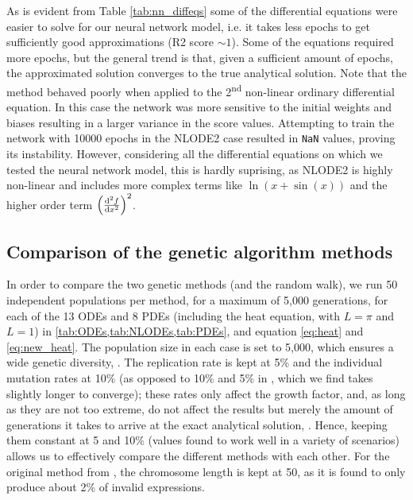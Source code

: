 \documentclass[aps,reprint,superscriptaddress,nofootinbib]{revtex4-2}
\begin{document}
    As is evident from Table \ref{tab:nn_diffeqs} some of the differential equations were easier to solve for our neural network model, i.e. it takes less epochs to get sufficiently good approximations (R2 score $\sim 1$). Some of the equations required more epochs, but the general trend is that, given a sufficient amount of epochs, the approximated solution converges to the true analytical solution.
    Note that the method behaved poorly when applied to the 2\textsuperscript{nd} non-linear ordinary differential equation. In this case the network was more sensitive to the initial weights and biases resulting in a larger variance in the score values. Attempting to train the network with 10000 epochs in the NLODE2 case resulted in \texttt{NaN} values, proving its instability. However, considering all the differential equations on which we tested the neural network model, this is hardly suprising, as NLODE2 is highly non-linear and includes more complex terms like $\ln(x + \sin(x))$ and the higher order term $\qty(\dv[2]{f}{x})^2$.
    
\subsection{Comparison of the genetic algorithm methods}
    
    In order to compare the two genetic methods (and the random walk), we run 50 independent populations per method, for a maximum of 5,000 generations, for each of the 13 ODEs and 8 PDEs (including the heat equation, with \(L = \pi\) and \(L = 1\)) in \cref{tab:ODEs,tab:NLODEs,tab:PDEs}, and equation \eqref{eq:heat} and \eqref{eq:new_heat}. The population size in each case is set to 5,000, which ensures a wide genetic diversity, \cite{solving_diff_reproduce}. The replication rate is kept at 5\% and the individual mutation rates at 10\% (as opposed to 10\% and 5\% in \cite{solving_diff_reproduce}, which we find takes slightly longer to converge); these rates only affect the growth factor, and, as long as they are not too extreme, do not affect the results but merely the amount of generations it takes to arrive at the exact analytical solution, \cite{parameterless_ga}. Hence, keeping them constant at 5 and 10\% (values found to work well in a variety of scenarios) allows us to effectively compare the different methods with each other. For the original method from \cite{solving_diff_reproduce}, the chromosome length is kept at 50, as it is found to only produce about 2\% of invalid expressions.
    
\end{document}
